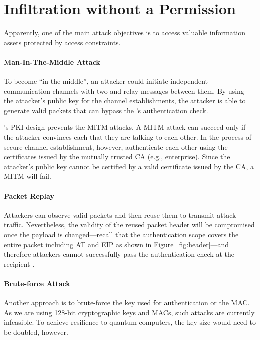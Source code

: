 \section{Infiltration without a Permission}
\label{sec:infiltration}

Apparently, one of the main attack objectives is to access valuable information assets
protected by access constraints.

\paragraph{Man-In-The-Middle Attack}
To become ``in the middle'', an attacker could initiate independent communication channels
with two \tps and relay messages between them. By using the attacker's public key for the
channel establishments, the attacker is able to generate valid packets that can bypass the
\tp's authentication check.

\name's PKI design prevents the MITM attacks. A MITM attack
can succeed only if the attacker convinces each \tp that they are talking to each other.
In the process of secure channel establishment, however, \tps authenticate each other using
the certificates issued by the mutually trusted CA (e.g., enterprise). Since the attacker's
public key cannot be certified by a valid certificate issued by the CA, a MITM will fail.


\paragraph{Packet Replay}
Attackers can observe valid \name packets and then reuse them to transmit attack traffic.
Nevertheless, the validity of the reused packet header will be compromised once the payload
is changed---recall that the authentication scope covers the entire packet including
AT and EIP as shown in Figure~\ref{fig:header}---and therefore attackers cannot
successfully pass the authentication check at the recipient \tp.


\paragraph{Brute-force Attack}
Another approach is to brute-force the key used for authentication or the MAC. As we are using 128-bit cryptographic keys and MACs, such attacks are currently infeasible. To achieve resilience to quantum computers, the key size would need to be doubled, however.


